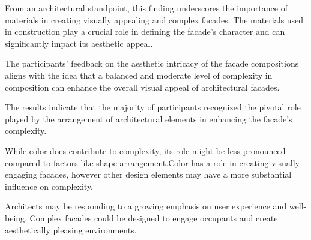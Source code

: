 
From an architectural standpoint, this finding underscores the importance of materials in creating visually appealing and complex facades.
 The materials used in construction play a crucial role in defining the facade's character and can significantly impact its aesthetic appeal.

The participants' feedback on the aesthetic intricacy of the facade compositions aligns with the idea that a balanced and moderate level of complexity in composition can enhance the overall visual appeal of architectural facades.

The results indicate that the majority of participants recognized the pivotal role played by the arrangement of architectural elements in enhancing the facade's complexity.

While color does contribute to complexity, its role might be less pronounced compared to factors like shape arrangement.Color has a role in creating visually engaging facades, however other design elements may have a more substantial influence on complexity.

 Architects may be responding to a growing emphasis on user experience and well-being.
 Complex facades could be designed to engage occupants and create aesthetically pleasing environments.


